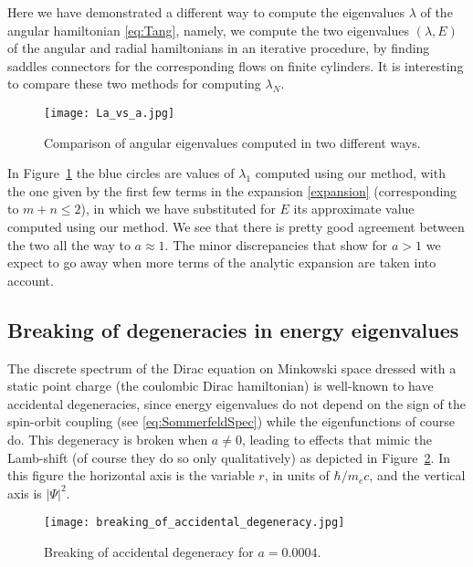 \documentclass[11 pt]{article}
\renewcommand\({\left(}
\renewcommand\){\right)}
\newcommand\<{\langle}
\renewcommand\>{\rangle}
\newcommand\8{\infty}
\newcommand{\red}[1]{\textcolor{red}{#1}}
\newcommand{\la} {\lambda}\newcommand{\La}{\Lambda}
\begin{document}
Here we have demonstrated a different way to compute the eigenvalues $\lambda$ of the angular hamiltonian \eqref{eq:Tang}, namely, we compute the two eigenvalues $(\lambda,E)$ of the angular and radial hamiltonians in an iterative procedure, by finding saddles connectors for the corresponding flows on finite cylinders.  It is interesting to compare these two methods for computing $\lambda_N$.
\begin{figure}[h!]
\centering
\texttt{[image: La\_vs\_a.jpg]}
\caption{Comparison of angular eigenvalues computed in two different ways. %
}
\label{fig:comparison}
\end{figure}
In Figure~\ref{fig:comparison} the blue circles are values of $\la_1$ computed using our method, with the one given by the first few terms in the expansion \eqref{expansion} (corresponding to $m+n\leq 2$), in which we have substituted for $E$ its approximate value computed using our method.  We see that there is pretty good agreement between the two all the way to $a\approx 1$. The minor discrepancies that show for $a>1$ we expect to 
go away when more terms of the analytic expansion are taken into account.

\subsection{Breaking of degeneracies in energy eigenvalues}
The discrete spectrum of the Dirac equation on Minkowski space dressed with a static point charge (the coulombic Dirac hamiltonian)
is well-known to have accidental degeneracies, since energy eigenvalues do not depend on the sign of the spin-orbit coupling (see \eqref{eq:SommerfeldSpec}) while the eigenfunctions of course do.  This degeneracy is broken when $a\ne 0$, leading to effects that mimic the Lamb-shift (of course they do so only qualitatively) as depicted in Figure~\ref{fig:lambshift}.  In this figure the horizontal axis is the variable $r$, in units of $\hbar/m_ec$, and the vertical axis is $|\Psi|^2$.
\begin{figure}[h!]
\centering
\texttt{[image: breaking\_of\_accidental\_degeneracy.jpg]}
\caption{Breaking of accidental degeneracy for $a = 0.0004$. }
\label{fig:lambshift}
\end{figure}
\end{document}

